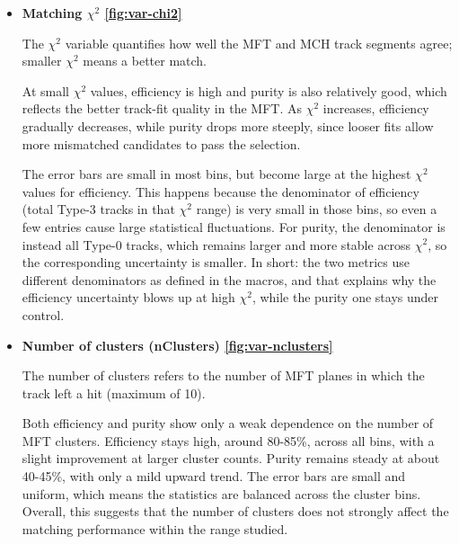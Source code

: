\documentclass{article}
\begin{document}
\begin{itemize}
    The efficiency depends strongly on pseudorapidity. It starts lower at the edges of acceptance (around $\eta = -3.6$) but rises quickly and stays
    high (about 80-90\%) in the central region. This shows that the matching works best where both detectors have good overlap. 
    The purity is more stable, sitting between 40-50\% across most of the $\eta$ range, with only mild variations. 
    The error bars are small everywhere, meaning the simulation had plenty of tracks in this kinematic region, so the results are statistically solid.

    \item \textbf{Matching $\chi^2$ \cref{fig:var-chi2}}

    The $\chi^2$ variable quantifies how well the MFT and MCH track segments agree; smaller $\chi^2$ means a better match.

    At small $\chi^2$ values, efficiency is high and purity is also relatively good, which reflects the better track-fit quality in the MFT. 
    As $\chi^2$ increases, efficiency gradually decreases, while purity drops more steeply, since looser fits allow more mismatched candidates 
    to pass the selection.

    The error bars are small in most bins, but become large at the highest $\chi^2$ values for efficiency. This happens because the denominator 
    of efficiency (total Type-3 tracks in that $\chi^2$ range) is very small in those bins, so even a few entries cause large statistical fluctuations. 
    For purity, the denominator is instead all Type-0 tracks, which remains larger and more stable across $\chi^2$, 
    so the corresponding uncertainty is smaller. In short: the two metrics use different denominators as defined in the macros, 
    and that explains why the efficiency uncertainty blows up at high $\chi^2$, while the purity one stays under control.

    \item \textbf{Number of clusters (nClusters) \cref{fig:var-nclusters}}
    
    The number of clusters refers to the number of MFT planes in which the track left a hit (maximum of 10).

    Both efficiency and purity show only a weak dependence on the number of MFT clusters. Efficiency stays high, around 80-85\%, 
    across all bins, with a slight improvement at larger cluster counts. Purity remains steady at about 40-45\%, with only a mild upward trend. 
    The error bars are small and uniform, which means the statistics are balanced across the cluster bins. 
    Overall, this suggests that the number of clusters does not strongly affect the matching performance within the range studied.
\end{itemize}
\end{document}
